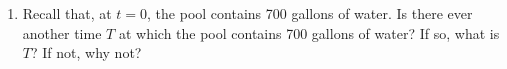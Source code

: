 \documentclass[main]{subfiles}
\begin{document}
\begin{enumerate}[resume]
\begin{enumerate}
    \begin{problem}[0.25in]
      Between $t=4$ and $t=12$, what is the net change in the amount of
      water in the pool?  Express your answer as a definite integral.
    \end{problem}

    \begin{solution}
      $\displaystyle \int_4^{12} r(t)\,dt$.
    \end{solution}

  \item
    \begin{problem}[\stretch{1.5}]
      Recall that, at $t=0$, the pool contains 700 gallons of water. Is
      there ever another time $T$ at which the pool contains 700 gallons
      of water?  If so, what is $T$?  If not, why not?
    \end{problem}


\end{enumerate}
\end{enumerate}
\end{document}
